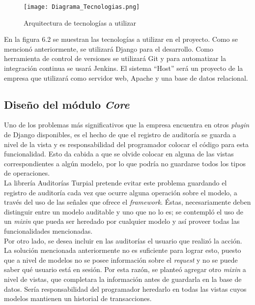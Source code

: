 \begin{figure}[h]
\centering
\texttt{[image: Diagrama\_Tecnologias.png]}
\caption{Arquitectura de tecnologías a utilizar}
\label{fig:figure6.2}
\end{figure}

En la figura 6.2 se muestran las tecnologías a utilizar en el proyecto. Como se mencionó anteriormente, se utilizará Django para el desarrollo. Como herramienta de control de versiones se utilizará Git y para automatizar la integración continua se usará Jenkins. El sistema “Host” será un proyecto de la empresa que utilizará como servidor web, Apache y una base de datos relacional.

\subsection{Diseño del módulo \textit{Core}}

Uno de los problemas más significativos que la empresa encuentra en otros \textit{plugin} de Django disponibles, es el hecho de que el registro de auditoría se guarda a nivel de la vista y es responsabilidad del programador colocar el código para esta funcionalidad. Esto da cabida a que se olvide colocar en alguna de las vistas correspondientes a algún modelo, por lo que podría no guardarse todos los tipos de operaciones. \\

La librería Auditorías Turpial pretende evitar este problema guardando el registro de auditoría cada vez que ocurre alguna operación sobre el modelo, a través del uso de las señales que ofrece el \textit{framework}. Éstas, necesariamente deben distinguir entre un modelo auditable y uno que no lo es; se contempló el uso de un \textit{mixin} que pueda ser heredado por cualquier modelo y así proveer todas las funcionalidades mencionadas. \\

Por otro lado, se desea incluir en las auditorías el usuario que realizó la acción. La solución mencionada anteriormente no es suficiente para lograr esto, puesto que a nivel de modelos no se posee información sobre el \textit{request} y no se puede saber qué usuario está en sesión. Por esta razón, se planteó agregar otro \textit{mixin} a nivel de vistas, que completara la información antes de guardarla en la base de datos. Sería responsabilidad del programador heredarlo en todas las vistas cuyos modelos mantienen un historial de transacciones.\\

